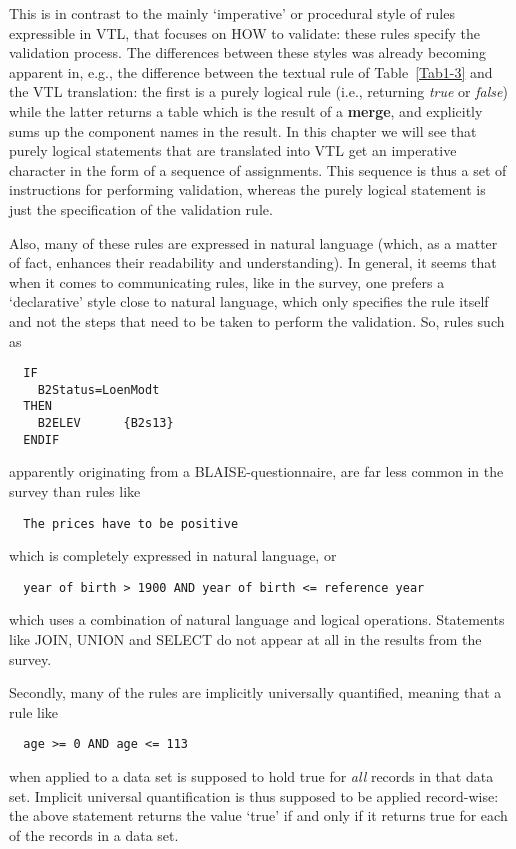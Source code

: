 This is in contrast to the  mainly `imperative' or procedural style of rules expressible in VTL, that focuses on HOW to validate: these rules specify the validation process. The differences between these styles was already becoming apparent in, e.g., the difference between the textual rule of Table~\ref{Tab1-3} and the VTL translation: the first is a purely logical rule (i.e., returning {\it true} or {\it false}) while the latter returns a table which is the result of a {\bf merge}, and explicitly sums up the component names in the result. In this chapter we will see that purely logical statements that are translated into VTL get an imperative character in the form of a sequence of assignments. This sequence is thus a set of instructions for performing validation, whereas the purely logical statement is just the specification of the validation rule.

Also, many of these rules are expressed in natural language (which, as a matter of fact, enhances their readability and understanding). In general, it seems that when it comes to communicating rules, like in the survey, one prefers a `declarative' style close to natural language, which only specifies the rule itself and not the steps that need to be taken to perform the validation. So, rules such as
\begin{verbatim}
  IF
    B2Status=LoenModt
  THEN
    B2ELEV		{B2s13}
  ENDIF
\end{verbatim}
apparently originating from a BLAISE-questionnaire, are far less common in the survey than rules like
\begin{verbatim}
  The prices have to be positive
\end{verbatim}
which is completely expressed in natural language, or
\begin{verbatim}
  year of birth > 1900 AND year of birth <= reference year
\end{verbatim}
which uses a combination of natural language and logical operations. Statements like JOIN, UNION and SELECT do not appear at all in the results from the survey.

Secondly, many of the rules are implicitly universally quantified, meaning that a rule like
\begin{verbatim}
  age >= 0 AND age <= 113
\end{verbatim}
when applied to a data set is supposed to hold true for {\em all} records in that data set. Implicit universal quantification is thus supposed to be applied record-wise: the above statement returns the value `true' if and only if it returns true for each of the records in a data set.

